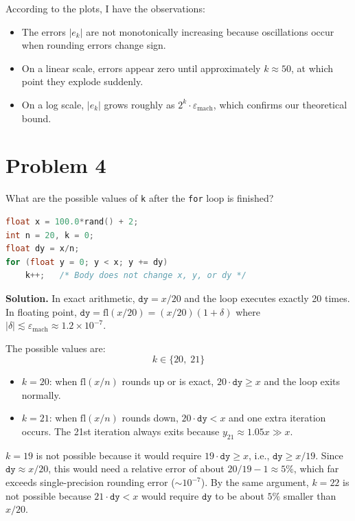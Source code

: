 \documentclass[letterpaper, 11pt]{article}
\newcommand{\1}{\mathds{1}}	%
\newcommand{\fl}{\text{fl}}	%
\theoremstyle{definition}
\begin{document}
According to the plots, I have the observations:
\begin{itemize}[nosep]
  \item The errors $|e_k|$ are not monotonically increasing because oscillations occur when rounding errors change sign.
  \item On a linear scale, errors appear zero until approximately $k \approx 50$, at which point they explode suddenly.
  \item On a log scale, $|e_k|$ grows roughly as $2^k \cdot \varepsilon_{\mathrm{mach}}$, which confirms our theoretical bound.
\end{itemize}


\section*{Problem 4}

What are the possible values of \texttt{k} after the \texttt{for} loop is finished?
\begin{lstlisting}[language=C, numbers=none]
float x = 100.0*rand() + 2;
int n = 20, k = 0;
float dy = x/n;
for (float y = 0; y < x; y += dy)
    k++;   /* Body does not change x, y, or dy */
\end{lstlisting}

\medskip

\textbf{Solution.} In exact arithmetic, $\texttt{dy} = x/20$ and the loop executes exactly 20 times. In floating point, $\texttt{dy} = \fl(x/20) = (x/20)(1+\delta)$ where $|\delta| \lesssim \varepsilon_{\mathrm{mach}} \approx 1.2 \times 10^{-7}$.

The possible values are:
\[
k \in \{20, \; 21\}
\]

\begin{itemize}[nosep]
  \item $k = 20$: when $\fl(x/n)$ rounds up or is exact, $20 \cdot \texttt{dy} \geq x$ and the loop exits normally.
  \item $k = 21$: when $\fl(x/n)$ rounds down, $20 \cdot \texttt{dy} < x$ and one extra iteration occurs. The 21st iteration always exits because $y_{21} \approx 1.05x \gg x$.
\end{itemize}

$k = 19$ is not possible because it would require $19 \cdot \texttt{dy} \geq x$, i.e., $\texttt{dy} \geq x/19$. Since $\texttt{dy} \approx x/20$, this would need a relative error of about $20/19 - 1 \approx 5\%$, which far exceeds single-precision rounding error ($\sim 10^{-7}$). By the same argument, $k = 22$ is not possible because $21 \cdot \texttt{dy} < x$ would require $\texttt{dy}$ to be about $5\%$ smaller than $x/20$.
\end{document}
